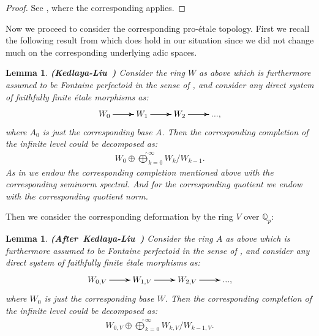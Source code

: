 \documentclass[12pt]{amsart}
\newtheorem{lemma}[theorem]{Lemma}
\theoremstyle{definition}
\numberwithin{equation}{section}
\begin{document}
\begin{proof}
See \cite[Proposition 3.4.3]{KL2}, where the corresponding \cite[Corollary 3.3.20]{KL2} applies.	
\end{proof}


\indent Now we proceed to consider the corresponding pro-\'etale topology. First we recall the following result from \cite[Lemma 3.4.4]{KL2} which does hold in our situation since we did not change much on the corresponding underlying adic spaces.


\begin{lemma}  \mbox{\bf{(Kedlaya-Liu \cite[Lemma 3.4.4]{KL2})}}
Consider the ring $W$ as above which is furthermore assumed to be Fontaine perfectoid in the sense of \cite[Definition 3.3.1]{KL2}, and consider any direct system of faithfully finite \'etale morphisms as:
\[
\xymatrix@C+0pc@R+0pc{
W_0 \ar[r] \ar[r] \ar[r] &W_1 \ar[r] \ar[r] \ar[r] &W_2  \ar[r] \ar[r] \ar[r] &...,   
}
\]	
where $A_0$ is just the corresponding base $A$. Then the corresponding completion of the infinite level could be decomposed as:
\begin{align}
W_0\oplus\widehat{\bigoplus}_{k=0}^\infty W_k/W_{k-1}.	
\end{align}
As in \cite[Lemma 3.4.4]{KL2} we endow the corresponding completion mentioned above with the corresponding seminorm spectral. And for the corresponding quotient we endow with the corresponding quotient norm.
\end{lemma}





\indent Then we consider the corresponding deformation by the ring $V$ over $\mathbb{Q}_p$:


\begin{lemma}  \mbox{\bf{(After Kedlaya-Liu \cite[Lemma 3.4.4]{KL2})}}
Consider the ring $A$ as above which is furthermore assumed to be Fontaine perfectoid in the sense of \cite[Definition 3.3.1]{KL2}, and consider any direct system of faithfully finite \'etale morphisms as:
\[
\xymatrix@C+0pc@R+0pc{
W_{0,V} \ar[r] \ar[r] \ar[r] &W_{1,V} \ar[r] \ar[r] \ar[r] &W_{2,V}  \ar[r] \ar[r] \ar[r] &..., 
}  
\]	
where $W_0$ is just the corresponding base $W$. Then the corresponding completion of the infinite level could be decomposed as:
\begin{align}
W_{0,V}\oplus\widehat{\bigoplus}_{k=0}^\infty W_{k,V}/W_{k-1,V}.	
\end{align}
\end{lemma}
\end{document}
